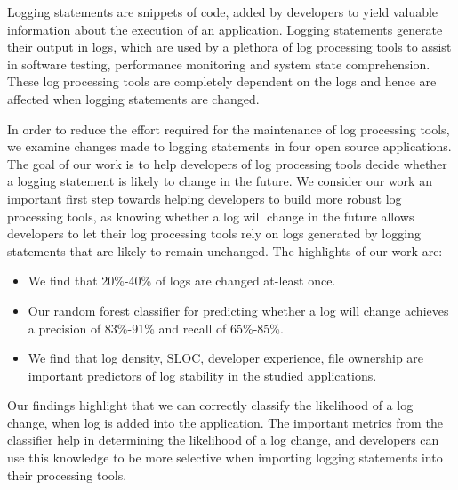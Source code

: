 Logging statements are snippets of code, added by developers to yield valuable information about the execution of an application. Logging statements generate their output in logs, which are used by a plethora of log processing tools to assist in software testing, performance monitoring and system state comprehension. These log processing tools are completely dependent on the logs and hence are affected when logging statements are changed.

In order to reduce the effort required for the maintenance of log processing tools, we examine changes made to logging statements in four open source applications. The goal of our work is to help developers of log processing tools decide whether a logging statement is likely to change in the future. We consider our work an important first step towards helping developers to build more robust log processing tools, as knowing whether a log will change in the future allows developers to let their log processing tools rely on logs generated by logging statements that are likely to remain unchanged. The highlights of our work are:


\begin{itemize}
	\item We find that 20\%-40\%  of logs are changed at-least once.
	\item Our random forest classifier for predicting whether a log will change achieves a precision of 83\%-91\% and recall of 65\%-85\%. 
	\item We find that log density, SLOC, developer experience, file ownership are important predictors of log stability in the studied applications.  	
	
\end{itemize}

Our findings highlight that we can correctly classify the likelihood of a log change, when log is added into the application. The important metrics from the classifier help in determining the likelihood of a log change, and developers can use this knowledge to be more selective when importing logging statements into their processing tools. 




